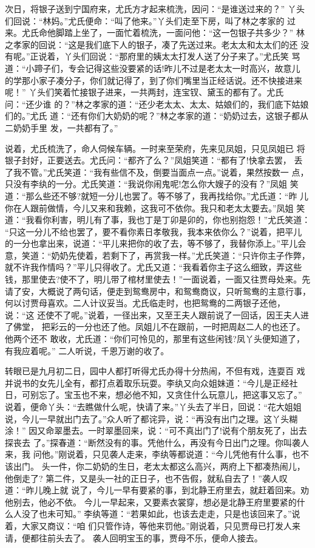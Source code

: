 次日，将银子送到宁国府来，尤氏方才起来梳洗，因问：“是谁送过来的？”
丫头们回说：“林妈。”尤氏便命：“叫了他来。”丫头们走至下房，叫了林之孝家的
过来。尤氏命他脚踏上坐了，一面忙着梳洗，一面问他：“这一包银子共多少？”
林之孝家的回说：“这是我们底下人的银子，凑了先送过来。老太太和太太们的还
没有呢。”正说着，丫头们回说：“那府里的姨太太打发人送了分子来了。”尤氏笑
骂道：“小蹄子们，专会记得这些没要紧的话!昨儿不过是老太太一时高兴，故意儿
的学那小家子凑分子，你们就记得了，到了你们嘴里当正经话说。还不快接进来呢！”
丫头们笑着忙接银子进来，一共两封，连宝钗、黛玉的都有了。尤氏问：“还少谁
的？”林之孝家的道：“还少老太太、太太、姑娘们的，我们底下姑娘们的。”尤氏
道：“还有你们大奶奶的呢？”林之孝家的道：“奶奶过去，这银子都从二奶奶手里
发，一共都有了。”

说着，尤氏梳洗了，命人伺候车辆。一时来至荣府，先来见凤姐，只见凤姐已
将银子封好，正要送去。尤氏问：“都齐了么？”凤姐笑道：“都有了!快拿去罢，
丢了我不管。”尤氏笑道：“我有些信不及，倒要当面点一点。”说着，果然按数一
点，只没有李纨的一分。尤氏笑道：“我说你闹鬼呢!怎么你大嫂子的没有？”凤姐
笑道：“那么些还不够?就短一分儿也罢了。等不够了，我再找给你。”尤氏道：“昨
儿你在人跟前做情，今儿又来和我赖，这我可不依你。我只和老太太要去。”凤姐
笑道：“我看你利害，明儿有了事，我也丁是丁卯是卯的，你也别抱怨！”尤氏笑道：
“只这一分儿不给也罢了，要不看你素日孝敬我，我本来依你么？”说着，把平儿
的一分也拿出来，说道：“平儿来把你的收了去，等不够了，我替你添上。”平儿会
意，笑道：“奶奶先使着，若剩下了，再赏我一样。”尤氏笑道：“只许你主子作弊，
就不许我作情吗？”平儿只得收了。尤氏又道：“我看着你主子这么细致，弄这些
钱，那里使去?使不了，明儿带了棺材里使去！”一面说着，一面又往贾母处来。先
请了安，大概说了两句话，便走到鸳鸯房中，和鸳鸯商议，只听鸳鸯的主意行事，
何以讨贾母喜欢。二人计议妥当。尤氏临走时，也把鸳鸯的二两银子还他，说：“这
还使不了呢。”说着，一径出来，又至王夫人跟前说了一回话，因王夫人进了佛堂，
把彩云的一分也还了他。凤姐儿不在跟前，一时把周赵二人的也还了。他两个还不
敢收，尤氏道：“你们可怜见的，那里有这些闲钱?凤丫头便知道了，有我应着呢。”
二人听说，千恩万谢的收了。

转眼已是九月初二日，园中人都打听得尤氏办得十分热闹，不但有戏，连耍百
戏并说书的女先儿全有，都打点着取乐玩耍。李纨又向众姐妹道：“今儿是正经社
日，可别忘了。宝玉也不来，想必他不知，又贪住什么玩意儿，把这事又忘了。”
说着，便命丫头：“去瞧做什么呢，快请了来。”丫头去了半日，回说：“花大姐姐
说，今儿一早就出门去了。”众人听了都诧异，说：“再没有出门之理。这丫头糊涂！”
因又命翠墨去。一时翠墨回来，说：“可不真出门了!说有个朋友死了，出去探丧去
了。”探春道：“断然没有的事。凭他什么，再没有今日出门之理。你叫袭人来，我
问他。”刚说着，只见袭人走来，李纨等都说道：“今儿凭他有什么事，也不该出门。
头一件，你二奶奶的生日，老太太都这么高兴，两府上下都凑热闹儿，他倒走了?
第二件，又是头一社的正日子，也不告假，就私自去了！”袭人叹道：“昨儿晚上就
说了，今儿一早有要紧的事，到北静王府里去，就赶着回来。劝他别去，他必不依。
今儿一早起来，又要素衣裳穿，想必是北静王府里要紧的什么人没了也未可知。”
李纨等道：“若果如此，也该去走走，只是也该回来了。”说着，大家又商议：“咱
们只管作诗，等他来罚他。”刚说着，只见贾母已打发人来请，便都往前头去了。
袭人回明宝玉的事，贾母不乐，便命人接去。

